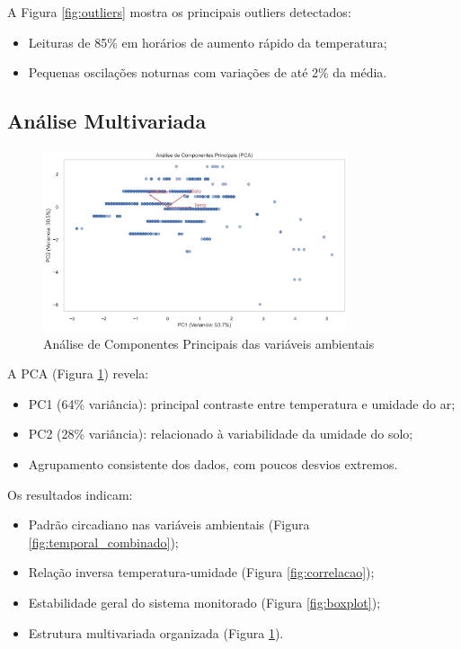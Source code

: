 \documentclass[12pt, a4paper]{article}
\begin{document}
A Figura \ref{fig:outliers} mostra os principais outliers detectados:
\begin{itemize}
    \item Leituras de 85\% em horários de aumento rápido da temperatura;
    \item Pequenas oscilações noturnas com variações de até 2\% da média.
\end{itemize}

\subsection{Análise Multivariada}
\begin{figure}[h]
\centering
\includegraphics[width=0.8\textwidth]{graficos/pca_ambiental.png}
\caption{Análise de Componentes Principais das variáveis ambientais}
\label{fig:pca}
\end{figure}

A PCA (Figura \ref{fig:pca}) revela:
\begin{itemize}
    \item PC1 (64\% variância): principal contraste entre temperatura e umidade do ar;
    \item PC2 (28\% variância): relacionado à variabilidade da umidade do solo;
    \item Agrupamento consistente dos dados, com poucos desvios extremos.
\end{itemize}

Os resultados indicam:
\begin{itemize}
    \item Padrão circadiano nas variáveis ambientais (Figura \ref{fig:temporal_combinado});
    \item Relação inversa temperatura-umidade (Figura \ref{fig:correlacao});
    \item Estabilidade geral do sistema monitorado (Figura \ref{fig:boxplot});
    \item Estrutura multivariada organizada (Figura \ref{fig:pca}).
\end{itemize}
\end{document}
